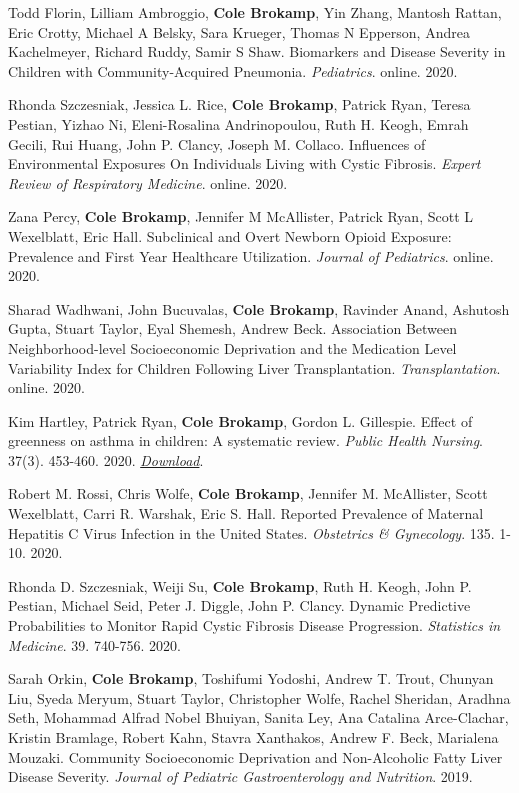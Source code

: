 Todd Florin, Lilliam Ambroggio, \textbf{Cole Brokamp}, Yin Zhang,
Mantosh Rattan, Eric Crotty, Michael A Belsky, Sara Krueger, Thomas N
Epperson, Andrea Kachelmeyer, Richard Ruddy, Samir S Shaw. Biomarkers
and Disease Severity in Children with Community-Acquired Pneumonia.
\emph{Pediatrics}. online. 2020.

Rhonda Szczesniak, Jessica L. Rice, \textbf{Cole Brokamp}, Patrick Ryan,
Teresa Pestian, Yizhao Ni, Eleni-Rosalina Andrinopoulou, Ruth H. Keogh,
Emrah Gecili, Rui Huang, John P. Clancy, Joseph M. Collaco. Influences
of Environmental Exposures On Individuals Living with Cystic Fibrosis.
\emph{Expert Review of Respiratory Medicine}. online. 2020.

Zana Percy, \textbf{Cole Brokamp}, Jennifer M McAllister, Patrick Ryan,
Scott L Wexelblatt, Eric Hall. Subclinical and Overt Newborn Opioid
Exposure: Prevalence and First Year Healthcare Utilization.
\emph{Journal of Pediatrics}. online. 2020.

Sharad Wadhwani, John Bucuvalas, \textbf{Cole Brokamp}, Ravinder Anand,
Ashutosh Gupta, Stuart Taylor, Eyal Shemesh, Andrew Beck. Association
Between Neighborhood-level Socioeconomic Deprivation and the Medication
Level Variability Index for Children Following Liver Transplantation.
\emph{Transplantation}. online. 2020.

Kim Hartley, Patrick Ryan, \textbf{Cole Brokamp}, Gordon L. Gillespie.
Effect of greenness on asthma in children: A systematic review.
\emph{Public Health Nursing}. 37(3). 453-460. 2020.
\href{https://colebrokamp-website.s3.us-east-1.amazonaws.com/publications/Hartley_PHN_2020.pdf}{\emph{Download}}.

Robert M. Rossi, Chris Wolfe, \textbf{Cole Brokamp}, Jennifer M.
McAllister, Scott Wexelblatt, Carri R. Warshak, Eric S. Hall. Reported
Prevalence of Maternal Hepatitis C Virus Infection in the United States.
\emph{Obstetrics \& Gynecology}. 135. 1-10. 2020.

Rhonda D. Szczesniak, Weiji Su, \textbf{Cole Brokamp}, Ruth H. Keogh,
John P. Pestian, Michael Seid, Peter J. Diggle, John P. Clancy. Dynamic
Predictive Probabilities to Monitor Rapid Cystic Fibrosis Disease
Progression. \emph{Statistics in Medicine}. 39. 740-756. 2020.

Sarah Orkin, \textbf{Cole Brokamp}, Toshifumi Yodoshi, Andrew T. Trout,
Chunyan Liu, Syeda Meryum, Stuart Taylor, Christopher Wolfe, Rachel
Sheridan, Aradhna Seth, Mohammad Alfrad Nobel Bhuiyan, Sanita Ley, Ana
Catalina Arce-Clachar, Kristin Bramlage, Robert Kahn, Stavra Xanthakos,
Andrew F. Beck, Marialena Mouzaki. Community Socioeconomic Deprivation
and Non-Alcoholic Fatty Liver Disease Severity. \emph{Journal of
Pediatric Gastroenterology and Nutrition}. 2019.

